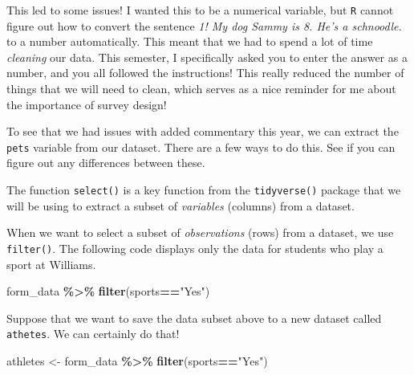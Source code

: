 \documentclass[
]{article}
\newenvironment{Shaded}{\begin{snugshade}}{\end{snugshade}}
\newcommand{\DecValTok}[1]{\textcolor[rgb]{0.00,0.00,0.81}{#1}}
\newcommand{\FunctionTok}[1]{\textcolor[rgb]{0.13,0.29,0.53}{\textbf{#1}}}
\newcommand{\NormalTok}[1]{#1}
\newcommand{\OtherTok}[1]{\textcolor[rgb]{0.56,0.35,0.01}{#1}}
\newcommand{\SpecialCharTok}[1]{\textcolor[rgb]{0.81,0.36,0.00}{\textbf{#1}}}
\newcommand{\StringTok}[1]{\textcolor[rgb]{0.31,0.60,0.02}{#1}}
\begin{document}
This led to some issues! I wanted this to be a numerical variable, but
\texttt{R} cannot figure out how to convert the sentence \emph{1! My dog
Sammy is 8. He's a schnoodle.} to a number automatically. This meant
that we had to spend a lot of time \emph{cleaning} our data. This
semester, I specifically asked you to enter the answer as a number, and
you all followed the instructions! This really reduced the number of
things that we will need to clean, which serves as a nice reminder for
me about the importance of survey design!

To see that we had issues with added commentary this year, we can
extract the \texttt{pets} variable from our dataset. There are a few
ways to do this. See if you can figure out any differences between
these.

\begin{Shaded}
\end{Shaded}

The function \texttt{select()} is a key function from the
\texttt{tidyverse()} package that we will be using to extract a subset
of \emph{variables} (columns) from a dataset.

When we want to select a subset of \emph{observations} (rows) from a
dataset, we use \texttt{filter()}. The following code displays only the
data for students who play a sport at Williams.

\begin{Shaded}
\begin{Highlighting}[]
\NormalTok{form\_data }\SpecialCharTok{\%\textgreater{}\%} \FunctionTok{filter}\NormalTok{(sports}\SpecialCharTok{==}\StringTok{"Yes"}\NormalTok{)}
\end{Highlighting}
\end{Shaded}

Suppose that we want to save the data subset above to a new dataset
called \texttt{athetes}. We can certainly do that!

\begin{Shaded}
\begin{Highlighting}[]
\NormalTok{athletes }\OtherTok{\textless{}{-}}\NormalTok{ form\_data }\SpecialCharTok{\%\textgreater{}\%} \FunctionTok{filter}\NormalTok{(sports}\SpecialCharTok{==}\StringTok{"Yes"}\NormalTok{)}
\end{Highlighting}
\end{Shaded}
\end{document}

